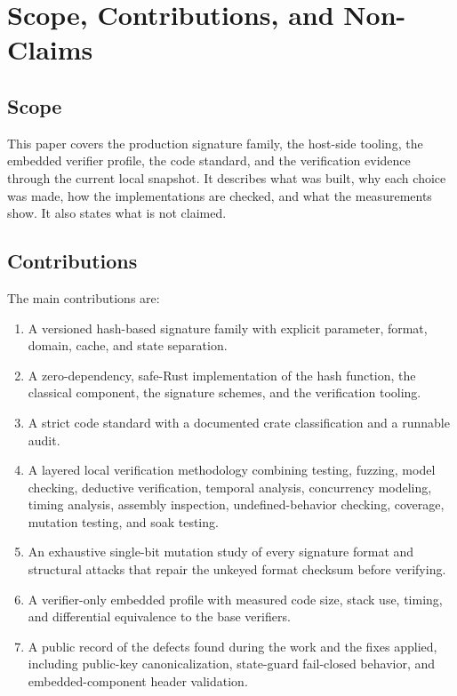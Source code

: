 \documentclass[11pt,a4paper]{article}
\begin{document}
\section{Scope, Contributions, and Non-Claims}

\subsection{Scope}

This paper covers the production signature family, the host-side tooling, the
embedded verifier profile, the code standard, and the verification evidence
through the current local snapshot. It describes what was built, why each
choice was made, how the implementations are checked, and what the measurements
show. It also states what is not claimed.

\subsection{Contributions}

The main contributions are:

\begin{enumerate}
  \item A versioned hash-based signature family with explicit parameter,
  format, domain, cache, and state separation.
  \item A zero-dependency, safe-Rust implementation of the hash function, the
  classical component, the signature schemes, and the verification tooling.
  \item A strict code standard with a documented crate classification and a
  runnable audit.
  \item A layered local verification methodology combining testing, fuzzing,
  model checking, deductive verification, temporal analysis, concurrency
  modeling, timing analysis, assembly inspection, undefined-behavior checking,
  coverage, mutation testing, and soak testing.
  \item An exhaustive single-bit mutation study of every signature format and
  structural attacks that repair the unkeyed format checksum before verifying.
  \item A verifier-only embedded profile with measured code size, stack use,
  timing, and differential equivalence to the base verifiers.
  \item A public record of the defects found during the work and the fixes
  applied, including public-key canonicalization, state-guard fail-closed
  behavior, and embedded-component header validation.
\end{enumerate}
\end{document}
